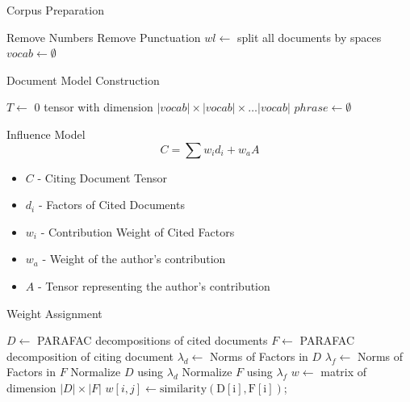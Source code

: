 \documentclass{beamer}
\begin{document}
\begin{frame}{Corpus Preparation}
\begin{algorithm}[H]
    Remove Numbers\;
    Remove Punctuation\;
    $wl \leftarrow $ split all documents by spaces\;
    $vocab \leftarrow \emptyset$\;
     {
    }
\end{algorithm}
\end{frame}

\begin{frame}{Document Model Construction}
\begin{algorithm}[H]
    $T \leftarrow$ 0 tensor with dimension $|vocab| \times |vocab| \times \ldots
    |vocab|$\;
    $phrase \leftarrow \emptyset$ \;
\end{algorithm}
\end{frame}

\begin{frame}{Influence Model}
    \[
    C = \sum w_id_i + w_a A
    \]
    \begin{itemize}[<+->]
        \item $C$ - Citing Document Tensor
        \item $d_i$ - Factors of Cited Documents
        \item $w_i$ - Contribution Weight of Cited Factors
        \item $w_a$ - Weight of the author's contribution
        \item $A$ - Tensor representing the author's contribution
    \end{itemize}
\end{frame}

\begin{frame}{Weight Assignment}
\begin{algorithm}[H]
    $D \leftarrow$ PARAFAC decompositions of cited documents\;
    $F \leftarrow$ PARAFAC decomposition of citing document\;
    $\lambda_d \leftarrow $ Norms of Factors in $D$\;
    $\lambda_f \leftarrow $ Norms of Factors in $F$\;
    Normalize $D$ using $\lambda_d$\;
    Normalize $F$ using $\lambda_f$\;
    $w \leftarrow $ matrix of dimension $|D| \times |F|$\;
     {
         {
            $w[i,j] \leftarrow \mathrm{similarity(D[i], F[i])}$;
        }
    }
\end{algorithm}
\end{frame}
\end{document}
